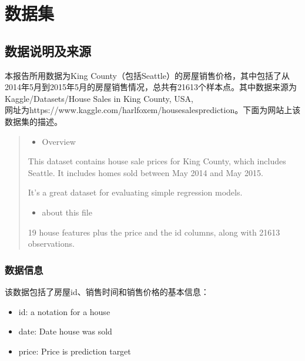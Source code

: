 \documentclass[]{article}
\providecommand{\tightlist}{%
  \setlength{\itemsep}{0pt}\setlength{\parskip}{0pt}}
\begin{document}
%


\section{数据集}





%
\subsection{数据说明及来源}

本报告所用数据为King
County（包括Seattle）的房屋销售价格，其中包括了从2014年5月到2015年5月的房屋销售情况，总共有21613个样本点。其中数据来源为Kaggle/Datasets/House Sales in King County, USA,\\
网址为https://www.kaggle.com/harlfoxem/housesalesprediction。下面为网站上该数据集的描述。

\begin{quote}
\begin{itemize}
\tightlist
\item
  Overview
\end{itemize}

This dataset contains house sale prices for King County, which includes
Seattle. It includes homes sold between May 2014 and May 2015.

It's a great dataset for evaluating simple regression models.

\begin{itemize}
\tightlist
\item
  about this file
\end{itemize}

19 house features plus the price and the id columns, along with 21613
observations.
\end{quote}




\subsubsection{数据信息}

该数据包括了房屋id、销售时间和销售价格的基本信息：

\begin{itemize}
\tightlist
\item
  id: a notation for a house
\item
  date: Date house was sold
\item
  price: Price is prediction target
\end{itemize}
\end{document}
